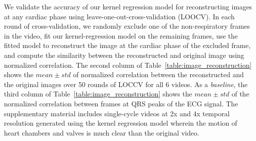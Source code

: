 \documentclass[runningheads,a4paper]{llncs}
\begin{document}
	We validate the accuracy of our kernel regression model for reconstructing images at any cardiac phase using leave-one-out-cross-validation (LOOCV). In each round of cross-validation, we randomly exclude one of the non-respiratory frames in the video, fit our kernel-regression model on the remaining frames, use the fitted model to reconstruct the image at the cardiac phase of the excluded frame, and compute the similarity between the reconstructed and original image using normalized correlation. The second column of Table~\ref{table:image_reconstruction} shows the $mean \pm std$ of normalized correlation between the reconstructed and the original images over 50 rounds of LOCCV for all 6 videos. As a \emph{baseline}, the third column of  Table~\ref{table:image_reconstruction} shows the $mean \pm std$ of the normalized correlation between frames at QRS peaks of the ECG signal. The supplementary material includes single-cycle videos at 2x and 4x temporal resolution generated using the kernel regression model wherein the motion of heart chambers and valves is much clear than the original video. 
%
%
\end{document}

